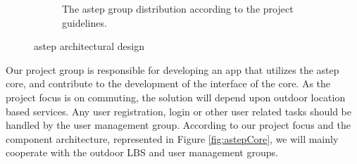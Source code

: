 \begin{figure}[h!]
\begin{subfigure}[b]{0.48\textwidth}
		\caption{The \gls{astep} group distribution according to the project guidelines.}
		\label{fig:astepGroups}
	\end{subfigure}
	\caption{\gls{astep} architectural design}
	\label{fig:astepArchitecture}
\end{figure}


Our project group is responsible for developing an app that utilizes the \gls{astep} core, and contribute to the development of the interface of the core.
As the project focus is on commuting, the solution will depend upon outdoor location based services.
Any user registration, login or other user related tasks should be handled by the user management group.
According to our project focus and the component architecture, represented in Figure \ref{fig:astepCore}, we will mainly cooperate with the outdoor LBS and user management groups.
